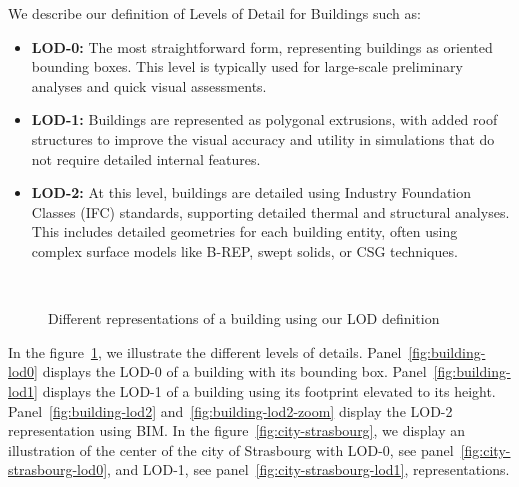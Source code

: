 \documentclass[runningheads]{llncs}
\begin{document}
We describe our definition of Levels of Detail for Buildings such as:
\begin{itemize}
    \item \textbf{LOD-0:} The most straightforward form, representing buildings as oriented bounding boxes. This level is typically used for large-scale preliminary analyses and quick visual assessments.
    \item \textbf{LOD-1:} Buildings are represented as polygonal extrusions, with added roof structures to improve the visual accuracy and utility in simulations that do not require detailed internal features.
    \item \textbf{LOD-2:} At this level, buildings are detailed using Industry Foundation Classes (IFC) standards, supporting detailed thermal and structural analyses. This includes detailed geometries for each building entity, often using complex surface models like B-REP, swept solids, or CSG techniques.
\end{itemize}


\begin{figure}[ht]%
\centering
{}
\\ %

{}

\caption{Different representations of a building using our LOD definition}
\label{fig:buildings}
\end{figure}

In the figure~\ref{fig:buildings}, we illustrate the different levels of details. Panel~\ref{fig:building-lod0} displays the LOD-0 of a building with its bounding box. Panel~\ref{fig:building-lod1} displays the LOD-1 of a building using its footprint elevated to its height. Panel~\ref{fig:building-lod2} and~\ref{fig:building-lod2-zoom} display the LOD-2 representation using BIM. In the figure~\ref{fig:city-strasbourg}, we display an illustration of the center of the city of Strasbourg with LOD-0, see panel~\ref{fig:city-strasbourg-lod0}, and LOD-1, see panel~\ref{fig:city-strasbourg-lod1}, representations.
\end{document}
